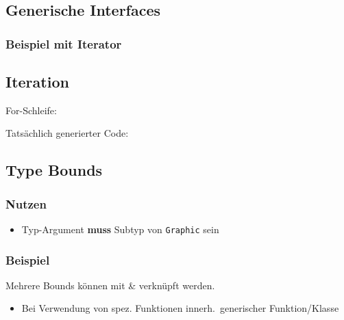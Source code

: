\subsection{Generische Interfaces}
\subsubsection{Beispiel mit Iterator}
\begin{minipage}[t]{0.5\columnwidth}
    \vspace{-0.7\abovedisplayskip}
    
\end{minipage}\hfill%
\begin{minipage}[t]{0.5\columnwidth}
    \vspace{-0.7\abovedisplayskip}
    
\end{minipage}

\subsection{Iteration}
\begin{minipage}[t]{0.32\columnwidth}
    For-Schleife:
    
\end{minipage}\hfill%
\begin{minipage}[t]{0.68\columnwidth}
    Tatsächlich generierter Code:
    
\end{minipage}

\subsection{Type Bounds}
\vspace{-0.8\abovedisplayskip}
\begin{minipage}[t]{0.39\columnwidth}
    \subsubsection{Nutzen}
    \raggedright%
    \begin{itemize}
        \item Typ-Argument \textbf{muss} Subtyp von \lstinline{Graphic} sein
    \end{itemize}
\end{minipage}\hfill%
\begin{minipage}[t]{0.6\columnwidth}
    \subsubsection{Beispiel}
    
    Mehrere Bounds können mit \& verknüpft werden.
\end{minipage}
\begin{itemize}
    \item Bei Verwendung von spez. Funktionen innerh.\ generischer Funktion/Klasse
\end{itemize}



